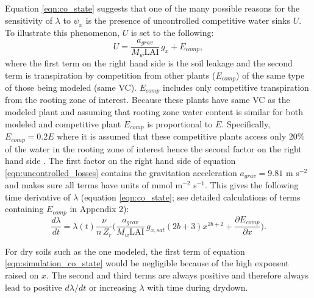 \documentclass[utf8]{frontiersSCNS} %
\begin{document}

Equation \ref{eqn:co_state} suggests that one of the many possible reasons for the sensitivity of $\lambda$ to $\psi_x$ is the presence of uncontrolled competitive water sinks $U$. To illustrate this phenomenon, $U$ is set to the following:
\begin{equation}
    U = \frac{a_{grav}}{M_w \text{LAI}} \, g_x + E_{comp},
    \label{eqn:uncontrolled_losses}
\end{equation}
where the first term on the right hand side is the soil leakage and the second term is transpiration by competition from other plants ($E_{comp}$) of the same type of those being modeled (same VC). $E_{comp}$ includes only competitive transpiration from the rooting zone of interest. Because these plants have same VC as the modeled plant and assuming that rooting zone water content is similar for both modeled and competitive plant $E_{comp}$ is proportional to $E$. Specifically, $E_{comp} = 0.2 E$ where it is assumed that these competitive plants access only 20\% of the water in the rooting zone of interest hence the second factor on the right hand side . The first factor on the right hand side of equation \ref{eqn:uncontrolled_losses} contains the gravitation acceleration $a_{grav} = 9.81$ m s$^{-2}$ and makes sure all terms have units of mmol m$^{-2}$ s$^{-1}$. This gives the following time derivative of $\lambda$ (equation \ref{eqn:co_state}; see detailed calculations of terms containing $E_{comp}$ in Appendix 2):
\begin{equation}
        \frac{d\lambda}{dt} = \lambda(t) \frac{\nu}{n\, Z_r} \Bigg( \frac{a_{grav}}{M_w \text{LAI}}\, g_{x,sat} (2b+3) x^{2b+2} + \frac{\partial E_{comp}}{\partial x} \Bigg).
    \label{eqn:simulation_co_state}
\end{equation}

For dry soils such as the one modeled, the first term of equation \ref{eqn:simulation_co_state} would be negligible because of the high exponent raised on $x$. The second and third terms are always positive and therefore always lead to positive $d\lambda/dt$ or increasing $\lambda$ with time during drydown.
\end{document}
